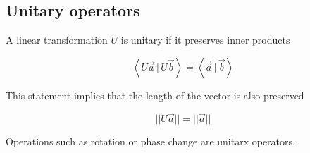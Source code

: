 \documentclass{article}
\newcommand{\braket}[1]{\left\langle#1\right\rangle}
\newcommand{\innerprod}[2]{\braket{#1\,|\,#2}}
\begin{document}
\subsection{Unitary operators}

A linear transformation \(U\) is unitary if it preserves inner products

\[
    \innerprod{U\vec{a}}{U\vec{b}} = \innerprod{\vec{a}}{\vec{b}}
\]

This statement implies that the length of the vector is also preserved

\[
    ||U\vec{a}|| = ||\vec{a}||
\]

Operations such as rotation or phase change are unitarx operators.
\end{document}
